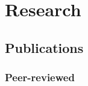 \documentclass[10pt,letterpaper]{article}
\renewenvironment{itemize}{
  \begin{list}{}{
    \setlength{\leftmargin}{1.5em}
    \setlength{\itemsep}{0.25em}
    \setlength{\parskip}{0pt}
    \setlength{\parsep}{0.25em}
  }
}{
  \end{list}
}
\begin{document}
\section*{Research}
%
%
%
%
%
%
%
%
%

\subsection*{Publications}

\subsubsection*{Peer-reviewed}
\end{document}
